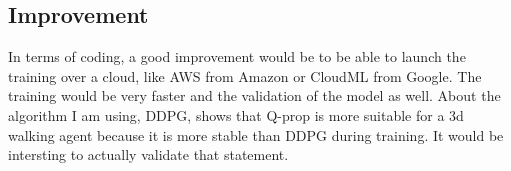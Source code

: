 \documentclass{article}
\begin{document}
\subsection{Improvement}

In terms of coding, a good improvement would be to be able to launch the training over a cloud,
like AWS from Amazon or CloudML from Google. The training would be very faster and the validation
of the model as well. About the algorithm I am using, DDPG, \citeauthor{GuLilGhaTurLev17} shows
that Q-prop is more suitable for a 3d walking agent because it is more stable than DDPG during
training. It would be intersting to actually validate that statement.



\end{document}
